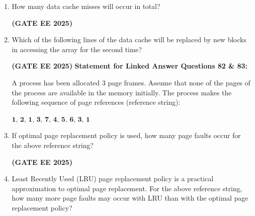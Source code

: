 \documentclass[journal,12pt,onecolumn]{IEEEtran}
\theoremstyle{remark}
\begin{document}
\begin {center}
\begin{enumerate}
    
    \item How many data cache misses will occur in total?
    \begin{enumerate}
    \end{enumerate}
\hfill \textbf{(GATE EE 2025)}
    \item Which of the following lines of the data cache will be replaced by new blocks in accessing the array for the second time?
    \begin{enumerate}
    \end{enumerate}

\hfill \textbf{(GATE EE 2025)}
\newline
\textbf{Statement for Linked Answer Questions 82 \& 83:}  

A process has been allocated 3 page frames. Assume that none of the pages of the process are available in the memory initially. The process makes the following sequence of page references (reference string):  

$\textbf{1, 2, 1, 3, 7, 4, 5, 6, 3, 1}$



    
    \item If optimal page replacement policy is used, how many page faults occur for the above reference string?
    \begin{enumerate}
    \end{enumerate}
\hfill \textbf{(GATE EE 2025)}
    \item Least Recently Used (LRU) page replacement policy is a practical approximation to optimal page replacement. For the above reference string, how many more page faults may occur with LRU than with the optimal page replacement policy?
    \begin{enumerate}
    \begin{multicols}{4}
        

\end{multicols}
\end{enumerate}
\end{enumerate}
\end{center}
\end{document}
